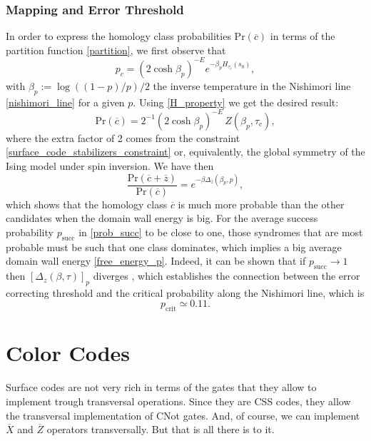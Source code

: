 \documentclass{article}
\newcommand{\prob}[1]{\mathrm{Pr}(#1)}
\begin{document}
\subsubsection{Mapping and Error Threshold}

In order to express the homology class probabilities $\prob{\overline c}$ in terms of the partition function \eqref{partition}, we first observe that
\begin{equation}\label{pc_H}
p_c = {(2\cosh \beta_p)^{-E}} {e^{-\beta_p H_{\tau_c}(s_0)}},
\end{equation}
with $\beta_p:= \log ((1-p)/p)/2$ the inverse temperature in the Nishimori line \eqref{nishimori_line} for a given $p$.
Using \eqref{H_property} we get the desired result:
\begin{equation}\label{}
\prob{\overline c}= 2^{-1} (2\cosh \beta_p)^{-E}\,Z(\beta_p,\tau_c),
\end{equation}
where the extra factor of 2 comes from the constraint \eqref{surface_code_stabilizers_constraint} or, equivalently, the global symmetry of the Ising model under spin inversion. We have then
\begin{equation}\label{}
\frac {\prob{\overline c+\overline z}}{ \prob{\overline c}}= e^{-\beta\Delta_{\overline z}(\beta_p,p)},
\end{equation}
which shows that the homology class $\overline c$ is much more probable than the other candidates when the domain wall energy is big. For the average success probability $p_\mathrm{succ}$ in 	\eqref{prob_succ} to be close to one, those syndromes that are most probable must be such that one class dominates, which implies a big average domain wall energy \eqref{free_energy_p}. Indeed, it can be shown that if $p_\mathrm{succ}\rightarrow 1$ then $[\Delta_z(\beta,\tau)]_{p}$ diverges \cite{bombin:2010:032301}, which establishes the connection between the error correcting threshold and the critical probability along the Nishimori line, which is
\begin{equation}\label{critical}
p_\mathrm{crit}\simeq 0.11.
\end{equation}


\section{Color Codes}

Surface codes are not very rich in terms of the gates that they allow to implement trough transversal operations. Since they are CSS codes, they allow the transversal implementation of CNot gates. And, of course, we can implement $\overline X$ and $\overline Z$ operators transversally. But that is all there is to it.
\end{document}

